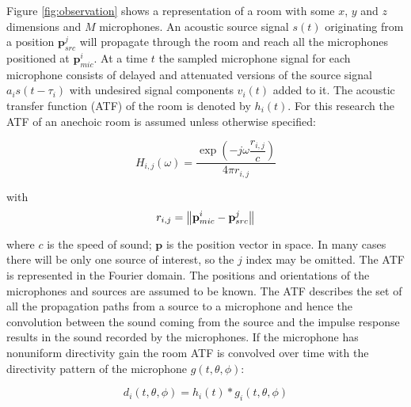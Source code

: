 Figure \ref{fig:observation} shows a representation of a room with some $x$, $y$ and $z$ dimensions and $M$ microphones. An acoustic source signal $s(t)$ originating from a position $\textbf{p}_{src}^{j}$ will propagate through the room and reach all the microphones positioned at $\textbf{p}_{mic}^{i}$. At a time $t$ the sampled microphone signal for each microphone consists of delayed and attenuated versions of the source signal $a_{i}s(t-\tau_{i})$ with undesired signal components $v_{i}(t)$ added to it. The acoustic transfer function (ATF) of the room is denoted by $h_{i}(t)$. For this research the ATF of an anechoic room is assumed unless otherwise specified:


\begin{equation}
\label{eq:ATF}
H_{i,j}(\omega) = \frac{\exp(-j\omega \dfrac{r_{i,j}}{c})}{4\pi r_{i,j}}
\end{equation}


with
\begin{equation}
r_{i,j} = \left\lVert\textbf{p}_{mic}^{i}-\textbf{p}_{src}^{j}\right\rVert
\end{equation}

where $c$ is the speed of sound; $\textbf{p}$ is the position vector in space. In many cases there will be only one source of interest, so the $j$ index may be omitted.
The ATF is represented in the Fourier domain. The positions and orientations of the microphones and sources are assumed to be known. The ATF describes the set of all the propagation paths from a source to a microphone and hence the convolution between the sound coming from the source and the impulse response results in the sound recorded by the microphones. If the microphone has nonuniform directivity gain the room ATF is convolved over time with the directivity pattern of the microphone $g(t,\theta,\phi)$:

\begin{equation}
\label{eq:look}
d_{i}(t,\theta,\phi) = h_i(t) \ast g_i(t,\theta,\phi)
\end{equation}

